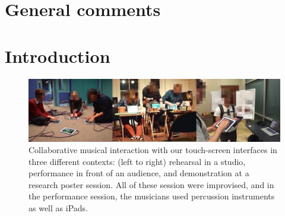 \documentclass{sigchi}
\begin{document}



\section{General comments}


\section{Introduction}

\begin{figure}
  \centering
  \includegraphics[width=\linewidth]{figures/three-performance-contexts}
  \caption{Collaborative musical interaction with our touch-screen
    interfaces in three different contexts: (left to right) rehearsal
    in a studio,
    performance in front of an audience, and demonstration at a
    research poster session. All of these session were improvised,
    and in the performance session, the musicians used percussion
    instruments as well as iPads.
    \label{fig:three-performance-contexts}}
\end{figure}
\end{document}
